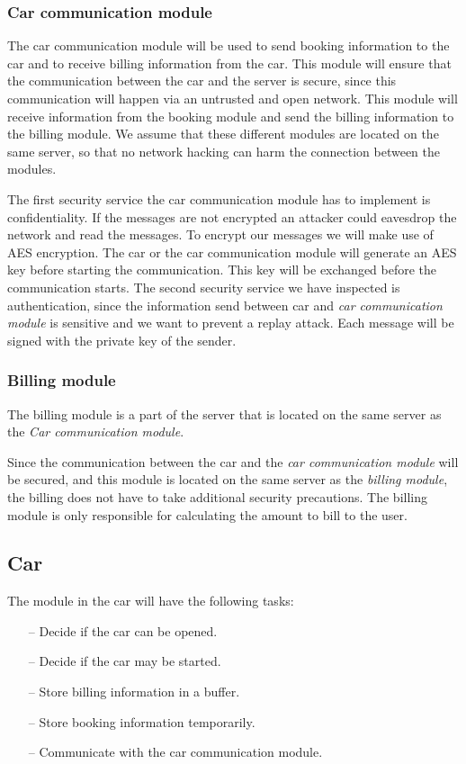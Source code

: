 \documentclass[12pt,a4paper, oneside]{article}
\newlength{\drop}
\begin{document}
\subsubsection{Car communication module}\label{sec:cc-module}
The car communication module will be used to send booking information to the car and to receive billing information from the car. This module will ensure that the communication between the car and the server is secure, since this communication will happen via an untrusted and open network. This module will receive information from the booking module and send the billing information to the billing module. We assume that these different modules are located on the same server, so that no network hacking can harm the connection between the modules.
\par The first security service the car communication module has to implement is confidentiality. If the messages are not encrypted an attacker could eavesdrop the network and read the messages. To encrypt our messages we will make use of AES encryption. The car or the car communication module will generate an AES key before starting the communication. This key will be exchanged before the communication starts. The second security service we have inspected is authentication, since the information send between car and \textit{car communication module} is sensitive and we want to prevent a replay attack. Each message will be signed with the private key of the sender.

\subsubsection{Billing module}\label{sec:billing-module}
The billing module is a part of the server that is located on the same server as the \textit{Car communication module}.\par
Since the communication between the car and the \textit{car communication module} will be secured, and this module is located on the same server as the \textit{billing module}, the billing does not have to take additional security precautions. The billing module is only responsible for calculating the amount to bill to the user.

\subsection{Car}
The module in the car will have the following tasks:
\begin{itemize}
\item[--] Decide if the car can be opened.
\item[--] Decide if the car may be started.
\item[--] Store billing information in a buffer.
\item[--] Store booking information temporarily.
\item[--] Communicate with the car communication module.
\end{itemize}
\end{document}
